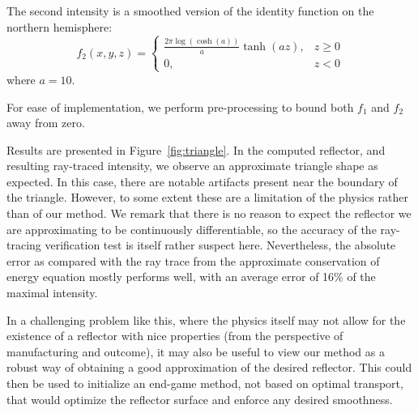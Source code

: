 \documentclass{amsart}
\theoremstyle{lemma}
\theoremstyle{remark}
\begin{document}
The second intensity is a smoothed version of the identity function on the northern hemisphere:
\begin{equation}
f_2(x,y,z) = 
\begin{cases}
\frac{2\pi  \log \left( \cosh(a) \right)}{a}\tanh(a z), &z \geq 0 \\
0, & z<0
\end{cases}
\end{equation}
where $a=10$.

For ease of implementation, we perform pre-processing to bound both $f_1$ and $f_2$ away from zero.



Results are presented in Figure~\ref{fig:triangle}.  In the computed reflector, and resulting ray-traced intensity, we observe an approximate triangle shape as expected. In this case, there are notable artifacts present near the boundary of the triangle. However, to some extent these are a limitation of the physics rather than of our method.  We remark that there is no reason to expect the reflector we are approximating to be continuously differentiable, so the accuracy of the ray-tracing verification test is itself rather suspect here.  Nevertheless, the absolute error as compared with the ray trace from the approximate conservation of energy equation mostly performs well, with an average error of 16\% of the maximal intensity.

In a challenging problem like this, where the physics itself may not allow for the existence of a reflector with nice properties (from the perspective of manufacturing and outcome), it may also be useful to view our method as a robust way of obtaining a good approximation of the desired reflector.  This could then be used to initialize an end-game method, not based on optimal transport, that would optimize the reflector surface and enforce any desired smoothness. 
\end{document}
